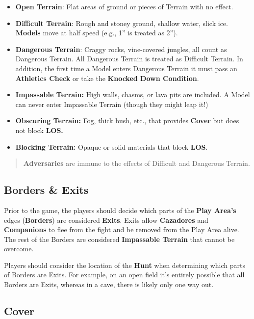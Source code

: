 \documentclass[
]{book}
\providecommand{\tightlist}{%
  \setlength{\itemsep}{0pt}\setlength{\parskip}{0pt}}
\begin{document}
\begin{itemize}
\tightlist
\item
  \textbf{Open Terrain}: Flat areas of ground or pieces of Terrain with no effect.
\item
  \textbf{Difficult Terrain}: Rough and stoney ground, shallow water, slick ice. \textbf{Models} move at half speed (e.g., 1'' is treated as 2'').
\item
  \textbf{Dangerous Terrain}: Craggy rocks, vine-covered jungles, all count as Dangerous Terrain. All Dangerous Terrain is treated as Difficult Terrain. In addition, the first time a Model enters Dangerous Terrain it must pass an \textbf{Athletics Check} or take the \textbf{Knocked Down Condition}.
\item
  \textbf{Impassable Terrain:} High walls, chasms, or lava pits are included. A Model can never enter Impassable Terrain (though they might leap it!)
\item
  \textbf{Obscuring Terrain:} Fog, thick bush, etc., that provides \textbf{Cover} but does not block \textbf{LOS.}
\item
  \textbf{Blocking Terrain:} Opaque or solid materials that block \textbf{LOS}.
\end{itemize}

\begin{quote}
\textbf{Adversaries} are immune to the effects of Difficult and Dangerous Terrain.
\end{quote}

\hypertarget{borders}{%
\subsection*{Borders \& Exits}\label{borders}}

Prior to the game, the players should decide which parts of the \textbf{Play Area's} edges (\textbf{Borders}) are considered \textbf{Exits}. Exits allow \textbf{Cazadores} and \textbf{Companions} to flee from the fight and be removed from the Play Area alive. The rest of the Borders are considered \textbf{Impassable Terrain} that cannot be overcome.

Players should consider the location of the \textbf{Hunt} when determining which parts of Borders are Exits. For example, on an open field it's entirely possible that all Borders are Exits, whereas in a cave, there is likely only one way out.

\hypertarget{cover}{%
\subsection*{Cover}\label{cover}}
\end{document}
